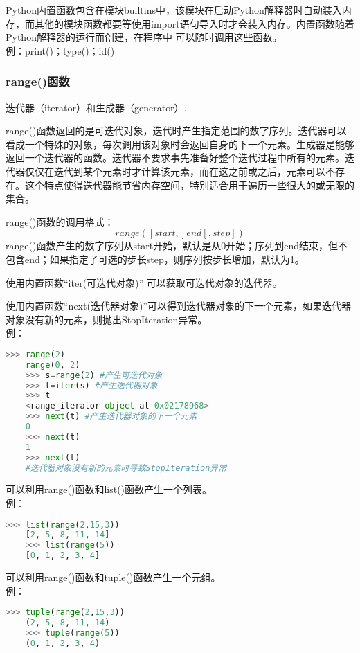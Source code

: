 \documentclass[11pt,a4paper]{article}
\begin{document}
Python内置函数包含在模块builtins中，该模块在启动Python解释器时自动装入内存，而其他的模块函数都要等使用import语句导入时才会装入内存。内置函数随着Python解释器的运行而创建，在程序中
可以随时调用这些函数。\\
例：print()；type()；id()

\subsubsection{range()函数}

迭代器（iterator）和生成器（generator）.

range()函数返回的是可迭代对象，迭代时产生指定范围的数字序列。迭代器可以看成一个特殊的对象，每次调用该对象时会返回自身的下一个元素。生成器是能够返回一个迭代器的函数。迭代器不要求事先准备好整个迭代过程中所有的元素。迭代器仅仅在迭代到某个元素时才计算该元素，而在这之前或之后，元素可以不存在。这个特点使得迭代器能节省内存空间，特别适合用于遍历一些很大的或无限的集合。

range()函数的调用格式：
$$range([start,]end[,step])$$
range()函数产生的数字序列从start开始，默认是从0开始；序列到end结束，但不包含end；如果指定了可选的步长step，则序列按步长增加，默认为1。

使用内置函数“iter(可迭代对象)” 可以获取可迭代对象的迭代器。

使用内置函数“next(迭代器对象)”可以得到迭代器对象的下一个元素，如果迭代器对象没有新的元素，则抛出StopIteration异常。\\
例：
\begin{lstlisting}[language={Python}]
    >>> range(2)
    range(0, 2)
    >>> s=range(2) #产生可迭代对象
    >>> t=iter(s) #产生迭代器对象
    >>> t
    <range_iterator object at 0x02178968>
    >>> next(t) #产生迭代器对象的下一个元素
    0
    >>> next(t)
    1
    >>> next(t)
    #迭代器对象没有新的元素时导致StopIteration异常
\end{lstlisting}

可以利用range()函数和list()函数产生一个列表。\\
例：
\begin{lstlisting}[language={Python}]
    >>> list(range(2,15,3))
    [2, 5, 8, 11, 14]
    >>> list(range(5))
    [0, 1, 2, 3, 4]
\end{lstlisting}

可以利用range()函数和tuple()函数产生一个元组。\\
例：
\begin{lstlisting}[language={Python}]
    >>> tuple(range(2,15,3))
    (2, 5, 8, 11, 14)
    >>> tuple(range(5))
    (0, 1, 2, 3, 4)
\end{lstlisting}
\end{document}
